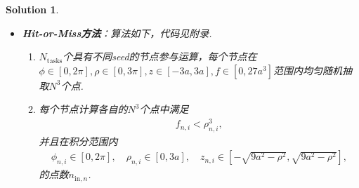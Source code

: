\documentclass[UTF8,10pt,a4paper]{article}
\theoremstyle{Problem}
\theoremstyle{Solution}
\newtheorem*{sol}{Solution}
\begin{document}
\begin{sol}
\begin{itemize}
\begin{itemize}
\begin{enumerate}
\begin{align}
                \end{align}
                \item 将所有处于积分范围内的离散点上的函数值求和取平均并乘上积分范围的体积，得到数值积分结果：
                \begin{align}
                    I\approx\frac{1}{N_{\text{tasks}}}\left(\frac{2\pi-0}{N}\right)\left(\frac{3a-0}{N}\right)\left(\frac{3a-(-3a)}{N}\right)\sum_{n=0}^{N_{\text{tasks}}-1}\sum_{i=1}^{N^3}f(\phi_{n,i},\rho_{n,i},z_{n,i})H(\phi_{n,i},\rho_{n,i},z_{n,i}).
                \end{align}
                \item 用CPU\_TIME来得到各个节点的计算耗时，将所有节点的计算耗时加和来作为计算总耗时，以积分的准确值$\frac{648\pi}{5}a^3$为平均值计算所有节点计算结果的标准差来作为计算误差：
                \small
                \begin{align}
                    \sigma=\left[\frac{1}{N_{\text{tasks}}}\sum_{n=0}^{N_{\text{tasks}}-1}\left(I_n-\frac{648\pi}{5}a^3\right)^2\right]^{1/2}.
                \end{align}
                其中
                \begin{align}
                    I_n=\left(\frac{2\pi}{N}\right)\left(\frac{3a-0}{N}\right)\left(\frac{3a-(-3a)}{N}\right)\sum_{i=1}^{N^3}f(\phi_{n,i},\rho_{n,i},z_{n,i})H(\phi_{n,i},\rho_{n,i},z_{n,i})
                \end{align}
                是标号为$n$的节点计算得到的积分值.
                \normalsize
            \end{enumerate}
            \item \textbf{Hit-or-Miss方法}：算法如下，代码见附录.
            \begin{enumerate}
                \item $N_{\text{tasks}}$个具有不同seed的节点参与运算，每个节点在$\phi\in[0,2\pi],\rho\in[0,3\pi],z\in[-3a,3a],f\in[0,27a^3]$范围内均匀随机抽取$N^3$个点.
                \item 每个节点计算各自的$N^3$个点中满足
                \begin{align}
                    f_{n,i}<\rho_{n,i}^3,
                \end{align}
                并且在积分范围内
                \begin{align}
                    \phi_{n,i}\in[0,2\pi],\quad\rho_{n,i}\in[0,3a],\quad z_{n,i}\in[-\sqrt{9a^2-\rho^2},\sqrt{9a^2-\rho^2}],
                \end{align}
                的点数$n_{\text{in},n}$.

\end{enumerate}
\end{itemize}
\end{itemize}
\end{sol}
\end{document}
